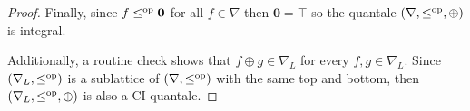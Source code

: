 \documentclass[10pt,a4paper]{amsart}
\begin{document}
\begin{proof}
		Finally, since $f\leq^\text{\normalfont op}\mathbf{0}$ for all $f\in\nabla$ then $\mathbf{0}=\top$ so the quantale $(\nabla,\leq^\text{\normalfont op},\oplus)$ is integral.
		
		Additionally, a routine check shows that $f\oplus g\in\nabla_L$ for every $f,g\in\nabla_L.$ Since $(\nabla_L,\leq^\text{\normalfont op})$ is a sublattice of $(\nabla,\leq^\text{\normalfont op})$ with the same top and bottom, then $(\nabla_L,\leq^\text{\normalfont op},\oplus)$ is also a CI-quantale.
	\end{proof}
\end{document}
